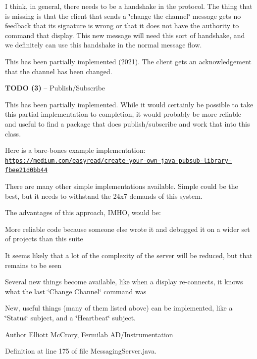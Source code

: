 I think, in general, there needs to be a handshake in the protocol. The thing that is missing is that the client that sends a \char`\"{}change the channel\char`\"{} message gets no feedback that its signature is wrong or that it does not have the authority to command that display. This new message will need this sort of handshake, and we definitely can use this handshake in the normal message flow.

This has been partially implemented (2021). The client gets an acknowledgement that the channel has been changed.

{\bfseries T\-O\-D\-O (3)} -- Publish/\-Subscribe

This has been partially implemented. While it would certainly be possible to take this partial implementation to completion, it would probably be more reliable and useful to find a package that does publish/subscribe and work that into this class.

Here is a bare-\/bones example implementation\-: \href{https://medium.com/easyread/create-your-own-java-pubsub-library-fbee21d0bb44}{\tt https\-://medium.\-com/easyread/create-\/your-\/own-\/java-\/pubsub-\/library-\/fbee21d0bb44}

There are many other simple implementations available. Simple could be the best, but it needs to withstand the 24x7 demands of this system.

The advantages of this approach, I\-M\-H\-O, would be\-: 
\begin{DoxyItemize}
\item More reliable code because someone else wrote it and debugged it on a wider set of projects than this suite 
\item It seems likely that a lot of the complexity of the server will be reduced, but that remains to be seen 
\item Several new things become available, like when a display re-\/connects, it knows what the last \char`\"{}\-Change Channel\char`\"{} command was  
\item New, useful things (many of them listed above) can be implemented, like a \char`\"{}\-Status\char`\"{} subject, and a \char`\"{}\-Heartbeat\char`\"{} subject. 
\end{DoxyItemize}

\begin{DoxyAuthor}{Author}
Elliott Mc\-Crory, Fermilab A\-D/\-Instrumentation 
\end{DoxyAuthor}


Definition at line 175 of file Messaging\-Server.\-java.



